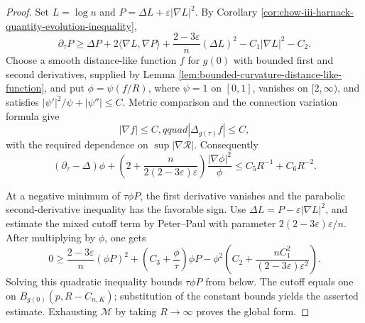\begin{proof}
Set \(L=\log u\) and
\(P=\Delta L+\varepsilon|\nabla L|^2\).  By Corollary
\ref{cor:chow-iii-harnack-quantity-evolution-inequality},
\[
 \partial_\tau P\geq\Delta P+2\langle\nabla L,\nabla P\rangle
 +\frac{2-3\varepsilon}{n}(\Delta L)^2-C_1|\nabla L|^2-C_2.
\]
Choose a smooth distance-like function \(f\) for \(g(0)\) with bounded first
and second derivatives, supplied by Lemma
\ref{lem:bounded-curvature-distance-like-function}, and put
\(\phi=\psi(f/R)\), where \(\psi=1\) on \([0,1]\), vanishes on
\([2,\infty)\), and satisfies
\(|\psi'|^2/\psi+|\psi''|\leq C\).  Metric comparison and the connection
variation formula give
\[
 |\nabla f|\leq C,qquad |\Delta_{g(\tau)}f|\leq C,
\]
with the required dependence on \(\sup|\nabla\mathcal R|\).  Consequently
\[
 (\partial_\tau-\Delta)\phi+
 \left(2+\frac{n}{2(2-3\varepsilon)\varepsilon}\right)
 \frac{|\nabla\phi|^2}{\phi}
 \leq C_5R^{-1}+C_6R^{-2}.
\]

At a negative minimum of \(\tau\phi P\), the first derivative vanishes and
the parabolic second-derivative inequality has the favorable sign.  Use
\(\Delta L=P-\varepsilon|\nabla L|^2\), and estimate the mixed cutoff term by
Peter--Paul with parameter
\(2(2-3\varepsilon)\varepsilon/n\).  After multiplying by \(\phi\), one gets
\[
 0\geq \frac{2-3\varepsilon}{n}(\phi P)^2
 +\left(C_3+\frac\phi\tau\right)\phi P
 -\phi^2\left(C_2+\frac{nC_1^2}
 {(2-3\varepsilon)\varepsilon^2}\right).
\]
Solving this quadratic inequality bounds \(\tau\phi P\) from below.
The cutoff equals one on \(B_{g(0)}(p,R-C_{n,K})\); substitution of the
constant bounds yields the asserted estimate.  Exhausting \(\mathcal M\)
by taking \(R\to\infty\) proves the global form.
\end{proof}

